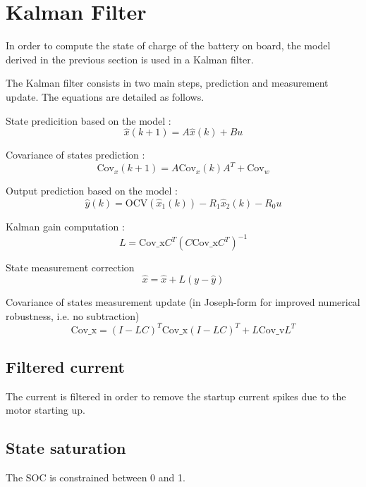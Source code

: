 \documentclass{article}
\begin{document}
\section{Kalman Filter}
In order to compute the state of charge of the battery on board, the model derived in the previous section is used in a Kalman filter. 

The Kalman filter consists in two main steps, prediction and measurement update. The equations are detailed as follows. 

State predicition based on the model : 
\begin{equation}
\hat{x}(k+1) = A\hat{x}(k) + Bu 
\label{eq:1a} 
\end{equation}

Covariance of states prediction :
\begin{equation}
\text{Cov}_x (k+1) = A\text{Cov}_x(k)A^T + \text{Cov}_w  
\label{eq:1b}
\end{equation}

Output prediction based on the model :
\begin{equation}
\hat{y}(k) = \text{OCV}(\hat{x}_1(k)) - R_1 \hat{x}_2(k) - R_0u
\label{eq:1c}
\end{equation}

Kalman gain computation :
\begin{equation}
L = \text{Cov_x} C^T (C \text{Cov_x} C^T)^{-1}
\label{eq:2a}
\end{equation}

State measurement correction
\begin{equation}
\hat{x} = \hat{x} + L(y-\hat{y})
\label{eq:2b}
\end{equation}

Covariance of states measurement update (in Joseph-form for improved numerical robustness, i.e. no subtraction)
\begin{equation}
\text{Cov_x} = (I-LC)^T \text{Cov_x} (I-LC)^T + L \text{Cov_v} L^T
\label{eq:2c}
\end{equation}

\subsection{Filtered current}
The current is filtered in order to remove the startup current spikes due to the motor starting up.

\subsection{State saturation}
The SOC is constrained between 0 and 1.
\end{document}
